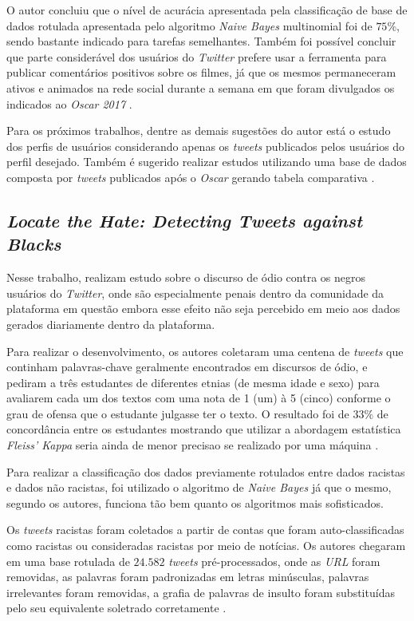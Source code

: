 O autor concluiu que o nível de acurácia apresentada pela classificação de base de dados rotulada apresentada pelo algoritmo \textit{Naive Bayes} multinomial foi de $75\%$, sendo bastante indicado para tarefas semelhantes. Também foi possível concluir que parte considerável dos usuários do \textit{Twitter} prefere usar a ferramenta para publicar comentários positivos sobre os filmes, já que os mesmos permaneceram ativos e animados na rede social durante a semana em que foram divulgados os indicados ao \textit{Oscar 2017} \cite{Correa2017}.

Para os próximos trabalhos, dentre as demais sugestões do autor está o estudo dos perfis de usuários considerando apenas os \textit{tweets} publicados pelos usuários do perfil desejado. Também é sugerido realizar estudos utilizando uma base de dados composta por \textit{tweets} publicados após o \textit{Oscar} gerando tabela comparativa \cite{Correa2017}.

\subsection{\textit{Locate the Hate: Detecting Tweets against Blacks}}

Nesse trabalho,  realizam estudo sobre o discurso de ódio contra os negros usuários do \textit{Twitter}, onde são especialmente penais dentro da comunidade da plataforma em questão embora esse efeito não seja percebido em meio aos dados gerados diariamente dentro da plataforma.

Para realizar o desenvolvimento, os autores coletaram uma centena de \textit{tweets} que continham palavras-chave geralmente encontrados em discursos de ódio, e pediram a três estudantes de diferentes etnias (de mesma idade e sexo) para avaliarem cada um dos textos com uma nota de 1 (um) à 5 (cinco) conforme o grau de ofensa que o estudante julgasse ter o texto. O resultado foi de $33\%$ de concordância entre os estudantes mostrando que utilizar a abordagem estatística \textit{Fleiss' Kappa} seria ainda de menor precisao se realizado por uma máquina \cite{kwok2013locate}.

Para realizar a classificação dos dados previamente rotulados entre dados racistas e dados não racistas, foi utilizado o algoritmo de \textit{Naive Bayes} já que o mesmo, segundo os autores, funciona tão bem quanto os algoritmos mais sofisticados.

Os \textit{tweets} racistas foram coletados a partir de contas que foram auto-classificadas como racistas ou consideradas racistas por meio de notícias. Os autores chegaram em uma base rotulada de $24.582$ \textit{tweets} pré-processados, onde as \textit{URL} foram removidas, as palavras foram padronizadas em letras minúsculas, palavras irrelevantes foram removidas, a grafia de palavras de insulto foram substituídas pelo seu equivalente soletrado corretamente \cite{kwok2013locate}.

